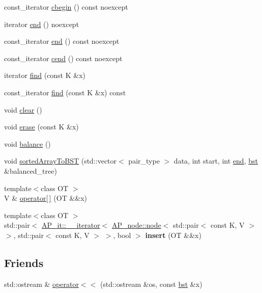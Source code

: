 \begin{DoxyCompactItemize}
\item 
const\+\_\+iterator \hyperlink{classBST_1_1bst_aeb386c648e83761a52fe4ff1ac493463}{cbegin} () const noexcept
\item 
iterator \hyperlink{classBST_1_1bst_a3620e47dedded6930a8b0488fe6ced6b}{end} () noexcept
\item 
const\+\_\+iterator \hyperlink{classBST_1_1bst_acd7c23bcd5cf4f947ce2c0ac88fe646b}{end} () const noexcept
\item 
const\+\_\+iterator \hyperlink{classBST_1_1bst_a17559d18bdbc5db5b77537a7044e449d}{cend} () const noexcept
\item 
iterator \hyperlink{classBST_1_1bst_a35880bb25ce5fbe2a10ce004b33cd5f2}{find} (const K \&x)
\item 
const\+\_\+iterator \hyperlink{classBST_1_1bst_a5c0e2b56c838441ec33d29c0184b941b}{find} (const K \&x) const
\item 
void \hyperlink{classBST_1_1bst_a25224d3f487fe02a1be8767e4fc3b8fd}{clear} ()
\item 
void \hyperlink{classBST_1_1bst_a6cd8cd1e40106c21145ae0949159bd34}{erase} (const K \&x)
\item 
void \hyperlink{classBST_1_1bst_af4df6a5c2ae79c5133688b3e117d622b}{balance} ()
\item 
void \hyperlink{classBST_1_1bst_a6e73f752cee124c1421fb32a6a6b4c8f}{sorted\+Array\+To\+B\+ST} (std\+::vector$<$ pair\+\_\+type $>$ data, int start, int \hyperlink{classBST_1_1bst_a3620e47dedded6930a8b0488fe6ced6b}{end}, \hyperlink{classBST_1_1bst}{bst} \&balanced\+\_\+tree)
\item 
{\footnotesize template$<$class OT $>$ }\\V \& \hyperlink{classBST_1_1bst_a4d960d28e5384f9cfc834f68405047da}{operator\mbox{[}$\,$\mbox{]}} (OT \&\&x)
\item 
\mbox{\label{classBST_1_1bst_ab48e8d9c62db301027f924af411f7b66}} 
{\footnotesize template$<$class OT $>$ }\\std\+::pair$<$ \hyperlink{classAP__it_1_1____iterator}{A\+P\+\_\+it\+::\+\_\+\+\_\+iterator}$<$ \hyperlink{structAP__node_1_1node}{A\+P\+\_\+node\+::node}$<$ std\+::pair$<$ const K, V $>$ $>$, std\+::pair$<$ const K, V $>$ $>$, bool $>$ {\bfseries insert} (OT \&\&x)
\end{DoxyCompactItemize}
\subsection*{Friends}
\begin{DoxyCompactItemize}
\item 
std\+::ostream \& \hyperlink{classBST_1_1bst_ae4b7d69364fca0855f74abdcad674ebf}{operator$<$$<$} (std\+::ostream \&os, const \hyperlink{classBST_1_1bst}{bst} \&x)
\end{DoxyCompactItemize}


